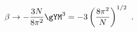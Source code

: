 \begin{equation}
\label{beta_limit}
  \beta\to -\frac{3N}{8\pi^2} \gYM^3 
  = -3 \left(\frac{8\pi^2}{N}\right)^{1/2}~.
\end{equation}

